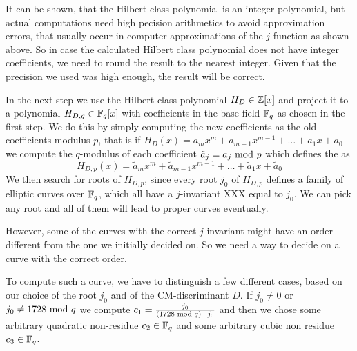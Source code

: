 It can be shown, that the Hilbert class polynomial is an integer polynomial, but actual computations need high pecision arithmetics to avoid approximation errors, that usually occur in computer approximations of the $j$-function as shown above. So in case the calculated Hilbert class polynomial does not have integer coefficients, we need to round the result to the nearest integer. Given that the precision we used was high enough, the result will be correct.

In the next step we use the Hilbert class polynomial $H_D\in \mathbb{Z}[x]$ and project it to a polynomial $H_{D,q}\in\mathbb{F}_q[x]$ with coefficients in the base field $\mathbb{F}_q$ as chosen in the first step. We do this by simply computing the new coefficients as the old coefficients modulus $p$, that is if $H_D(x)= a_mx^m +a_{m-1}x^{m-1}+\ldots + a_1 x + a_0$ we compute the $q$-modulus of each coefficient
$\tilde{a}_j = a_j \text{ mod } p$ which defines the  as 
$$
H_{D,p}(x)=\tilde{a}_mx^m +\tilde{a}_{m-1}x^{m-1}+\ldots + \tilde{a}_1 x + \tilde{a}_0
$$
We then search for roots of $H_{D,p}$, since every root $j_0$ of $H_{D,p}$ defines a family of elliptic curves over $\mathbb{F}_q$, which all have a $j$-invariant XXX equal to $j_0$. We can pick any root and all of them will lead to proper curves eventually.

However, some of the curves with the correct $j$-invariant might have an order different from the one we initially decided on. So we need a way to decide on a curve with the correct order. 

To compute such a curve, we have to distinguish a few different cases, based on our choice of the root $j_0$ and of the CM-discriminant $D$. If $j_0\neq 0$ or $j_0\neq 1728 \text{ mod } q$ we compute $c_1=\frac{j_0}{(1728 \text{ mod } q) -j_0}$ and then we chose some arbitrary quadratic non-residue $c_2\in \mathbb{F}_q$ and some arbitrary cubic non residue $c_3\in \mathbb{F}_q$. 

